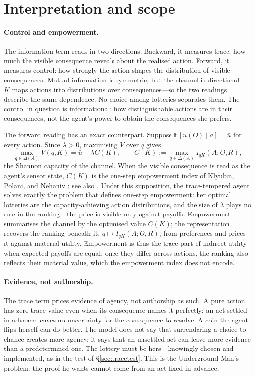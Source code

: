 \documentclass[11pt,a4paper]{article}
\theoremstyle{definition}
\newcommand{\E}{\mathbb E}
\newcommand{\1}{\mathbf 1}
\begin{document}
\section{Interpretation and scope}\label{sec:interpretation}

\paragraph{Control and empowerment.}
The information term reads in two directions.  Backward, it measures trace: how much the visible consequence
reveals about the realised action.  Forward, it measures control: how strongly the action shapes the
distribution of visible consequences.  Mutual information is symmetric, but the channel is
directional---$K$ maps actions into distributions over consequences---so the two readings describe the same
dependence.  No choice among lotteries separates them.  The control in question is informational: how
distinguishable actions are in their consequences, not the agent's power to obtain the consequences she
prefers.

The forward reading has an exact counterpart.  Suppose $\E[u(O)\mid a]=\bar u$ for every action.  Since
$\lambda>0$, maximising $V$ over $q$ gives
\[
 \max_{q\in\Delta(A)}V(q,K)=\bar u+\lambda C(K),
 \qquad
 C(K):=\max_{q\in\Delta(A)}I_{qK}(A;O,R),
\]
the Shannon capacity of the channel.  When the visible consequence is read as the agent's sensor state, $C(K)$
is the one-step empowerment index of Klyubin, Polani, and Nehaniv \cite{KlyubinPolaniNehaniv2005}; see also
\cite{SalgeGlackinPolani2014}.  Under this supposition, the trace-tempered agent solves exactly the problem
that defines one-step empowerment: her optimal lotteries are the capacity-achieving action distributions, and
the size of $\lambda$ plays no role in the ranking---the price is visible only against payoffs.  Empowerment
summarises the channel by the optimised value $C(K)$; the representation recovers the ranking beneath it,
$q\mapsto I_{qK}(A;O,R)$, from preferences and prices it against material utility.  Empowerment is thus the
trace part of indirect utility when expected payoffs are equal; once they differ across actions, the ranking
also reflects their material value, which the empowerment index does not encode.

\paragraph{Evidence, not authorship.}
The trace term prices evidence of agency, not authorship as such.  A pure action has zero trace value even when
its consequence names it perfectly: an act settled in advance leaves no uncertainty for the consequence to
resolve.  A coin the agent flips herself can do better.  The model does not say that surrendering a choice to
chance creates more agency; it says that an unsettled act can leave more evidence than a predetermined one.  The
lottery must be hers---knowingly chosen and implemented, as in the test of \S\ref{sec:tracetest}.  This is the
Underground Man's problem: the proof he wants cannot come from an act fixed in advance.
\end{document}
